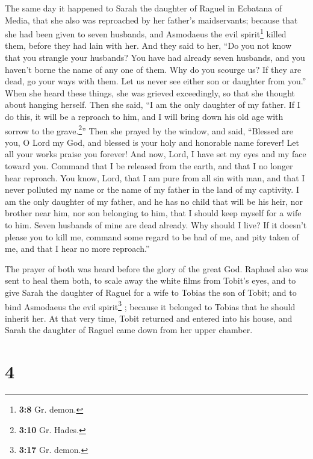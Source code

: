  The same day it happened to Sarah the daughter of Raguel
in Ecbatana of Media, that she also was reproached by her father's
maidservants;  because that she had been given to seven
husbands, and Asmodaeus the evil spirit\footnote{\textbf{3:8} Gr. demon.}
killed them, before they had lain with her. And they said to her, ``Do
you not know that you strangle your husbands? You have had already seven
husbands, and you haven't borne the name of any one of them.
 Why do you scourge us? If they are dead, go your ways
with them. Let us never see either son or daughter from you.''
 When she heard these things, she was grieved
exceedingly, so that she thought about hanging herself. Then she said,
``I am the only daughter of my father. If I do this, it will be a
reproach to him, and I will bring down his old age with sorrow to the
grave.\footnote{\textbf{3:10} Gr. Hades.}''  Then she
prayed by the window, and said, ``Blessed are you, O Lord my God, and
blessed is your holy and honorable name forever! Let all your works
praise you forever!  And now, Lord, I have set my eyes
and my face toward you.  Command that I be released from
the earth, and that I no longer hear reproach.  You know,
Lord, that I am pure from all sin with man,  and that I
never polluted my name or the name of my father in the land of my
captivity. I am the only daughter of my father, and he has no child that
will be his heir, nor brother near him, nor son belonging to him, that I
should keep myself for a wife to him. Seven husbands of mine are dead
already. Why should I live? If it doesn't please you to kill me, command
some regard to be had of me, and pity taken of me, and that I hear no
more reproach.''

 The prayer of both was heard before the glory of the
great God.  Raphael also was sent to heal them both, to
scale away the white films from Tobit's eyes, and to give Sarah the
daughter of Raguel for a wife to Tobias the son of Tobit; and to bind
Asmodaeus the evil spirit\footnote{\textbf{3:17} Gr. demon.} ; because
it belonged to Tobias that he should inherit her. At that very time,
Tobit returned and entered into his house, and Sarah the daughter of
Raguel came down from her upper chamber.

\hypertarget{section-3}{%
\section{4}\label{section-3}}

